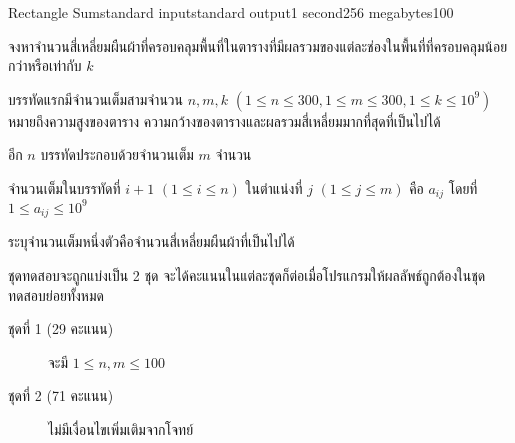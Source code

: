 \documentclass[11pt,a4paper]{article}
\begin{document}
\begin{problem}{Rectangle Sum}{standard input}{standard output}{1 second}{256 megabytes}{100}

จงหาจำนวนสี่เหลี่ยมผืนผ้าที่ครอบคลุมพื้นที่ในตารางที่มีผลรวมของแต่ละช่องในพื้นที่ที่ครอบคลุมน้อยกว่าหรือเท่ากับ $k$

\InputFile
บรรทัดแรกมีจำนวนเต็มสามจำนวน $n, m, k$ $(1 \leq n \leq 300, 1 \leq m \leq 300, 1 \leq k \leq 10^9)$ หมายถึงความสูงของตาราง ความกว้างของตารางและผลรวมสี่เหลี่ยมมากที่สุดที่เป็นไปได้

อีก $n$ บรรทัดประกอบด้วยจำนวนเต็ม $m$ จำนวน

จำนวนเต็มในบรรทัดที่ $i+1$ $(1 \leq i \leq n)$ ในตำแน่งที่ $j$ $(1 \leq j \leq m)$ คือ $a_{ij}$ โดยที่ $1 \leq a_{ij} \leq 10^9$

\OutputFile
ระบุจำนวนเต็มหนึ่งตัวคือจำนวนสี่เหลี่ยมผืนผ้าที่เป็นไปได้

\Scoring
ชุดทดสอบจะถูกแบ่งเป็น 2 ชุด จะได้คะแนนในแต่ละชุดก็ต่อเมื่อโปรแกรมให้ผลลัพธ์ถูกต้องในชุดทดสอบย่อยทั้งหมด
\begin{description}
\item[ชุดที่ 1 (29 คะแนน)] จะมี $1 \leq n, m \leq 100$

\item[ชุดที่ 2 (71 คะแนน)] ไม่มีเงื่อนไขเพิ่มเติมจากโจทย์
\end{description}

\Examples

\begin{example}
%
%
\end{example}

\end{problem}
\end{document}
